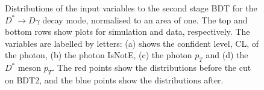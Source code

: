 \documentclass[oneside,12pt]{article}
\begin{document}
\begin{figure}[H]
\caption{{Distributions of the input variables to the second stage BDT for
the $D^* \rightarrow D\gamma$ decay mode, normalised to an area of one. The top
and bottom rows show plots for simulation and data, respectively. The variables
are labelled by letters: (a) shows the confident level, CL, of the photon, (b)
the photon IsNotE, (c) the photon $p_T$ and (d) the $D^*$ meson $p_T$. The red
points show the distributions before the cut on BDT2, and the blue points show
the distributions after.}} \label{fig:GammaBDT2Variables}
\end{figure}
\end{document}
